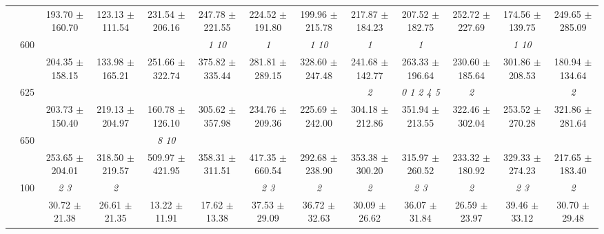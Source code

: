 \begin{table}[h]
{\begin{tabular}{
        ccccccccccccc}
 & & \cellcolor[HTML]{EFEFEF} 193.70 $\pm$ 160.70& \cellcolor[HTML]{EFEFEF} 123.13 $\pm$ 111.54& \cellcolor[HTML]{EFEFEF} 231.54 $\pm$ 206.16& \cellcolor[HTML]{EFEFEF} 247.78 $\pm$ 221.55& \cellcolor[HTML]{EFEFEF} 224.52 $\pm$ 191.80& \cellcolor[HTML]{EFEFEF} 199.96 $\pm$ 215.78& \cellcolor[HTML]{EFEFEF} 217.87 $\pm$ 184.23& \cellcolor[HTML]{EFEFEF} 207.52 $\pm$ 182.75& \cellcolor[HTML]{EFEFEF} 252.72 $\pm$ 227.69& \cellcolor[HTML]{EFEFEF} 174.56 $\pm$ 139.75& \cellcolor[HTML]{EFEFEF} 249.65 $\pm$ 285.09 \\ 
 & \multirow{2}{*}{600}& & & & \textit{  1 10 }& \textit{ 1 }& \textit{  1 10 }& \textit{ 1 }& \textit{ 1 }& & \textit{  1 10 }&  \\ 
 & & 204.35 $\pm$ 158.15& 133.98 $\pm$ 165.21& 251.66 $\pm$ 322.74& 375.82 $\pm$ 335.44& 281.81 $\pm$ 289.15& 328.60 $\pm$ 247.48& 241.68 $\pm$ 142.77& 263.33 $\pm$ 196.64& 230.60 $\pm$ 185.64& 301.86 $\pm$ 208.53& 180.94 $\pm$ 134.64 \\ 
 & \multirow{2}{*}{625}& \cellcolor[HTML]{EFEFEF} & \cellcolor[HTML]{EFEFEF} & \cellcolor[HTML]{EFEFEF} & \cellcolor[HTML]{EFEFEF} & \cellcolor[HTML]{EFEFEF} & \cellcolor[HTML]{EFEFEF} & \cellcolor[HTML]{EFEFEF} \textit{ 2 }& \cellcolor[HTML]{EFEFEF} \textit{ 0 1 2 4 5 }& \cellcolor[HTML]{EFEFEF} \textit{ 2 }& \cellcolor[HTML]{EFEFEF} & \cellcolor[HTML]{EFEFEF} \textit{ 2 } \\ 
 & & \cellcolor[HTML]{EFEFEF} 203.73 $\pm$ 150.40& \cellcolor[HTML]{EFEFEF} 219.13 $\pm$ 204.97& \cellcolor[HTML]{EFEFEF} 160.78 $\pm$ 126.10& \cellcolor[HTML]{EFEFEF} 305.62 $\pm$ 357.98& \cellcolor[HTML]{EFEFEF} 234.76 $\pm$ 209.36& \cellcolor[HTML]{EFEFEF} 225.69 $\pm$ 242.00& \cellcolor[HTML]{EFEFEF} 304.18 $\pm$ 212.86& \cellcolor[HTML]{EFEFEF} 351.94 $\pm$ 213.55& \cellcolor[HTML]{EFEFEF} 322.46 $\pm$ 302.04& \cellcolor[HTML]{EFEFEF} 253.52 $\pm$ 270.28& \cellcolor[HTML]{EFEFEF} 321.86 $\pm$ 281.64 \\ 
 & \multirow{2}{*}{650}& & & \textit{  8 10 }& & & & & & & &  \\ 
 & & 253.65 $\pm$ 204.01& 318.50 $\pm$ 219.57& 509.97 $\pm$ 421.95& 358.31 $\pm$ 311.51& 417.35 $\pm$ 660.54& 292.68 $\pm$ 238.90& 353.38 $\pm$ 300.20& 315.97 $\pm$ 260.52& 233.32 $\pm$ 180.92& 329.33 $\pm$ 274.23& 217.65 $\pm$ 183.40 \\ \midrule 
 & \multirow{2}{*}{100}& \textit{ 2 3 }& \textit{ 2 }& & & \textit{ 2 3 }& \textit{ 2 }& \textit{ 2 }& \textit{ 2 3 }& \textit{ 2 }& \textit{ 2 3 }& \textit{ 2 } \\ 
 & & 30.72 $\pm$ 21.38& 26.61 $\pm$ 21.35& 13.22 $\pm$ 11.91& 17.62 $\pm$ 13.38& 37.53 $\pm$ 29.09& 36.72 $\pm$ 32.63& 30.09 $\pm$ 26.62& 36.07 $\pm$ 31.84& 26.59 $\pm$ 23.97& 39.46 $\pm$ 33.12& 30.70 $\pm$ 29.48 \\ 

\end{tabular}}
\end{table}
